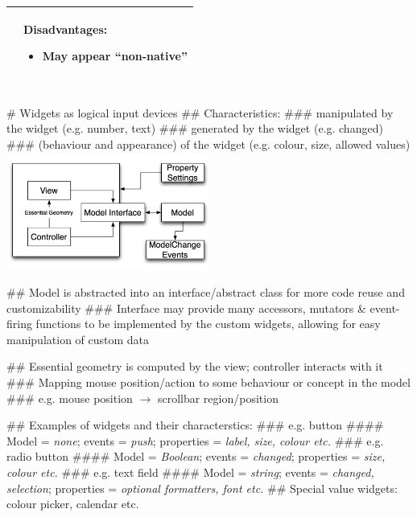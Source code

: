 \documentclass[11pt, oneside]{article}
\newcommand*{\un}[1]{\underline{\smash{#1}}}        %
\newenvironment{itemized}{\begin{itemize}[noitemsep, topsep=0pt, leftmargin=*]}{\end{itemize}}  %
\begin{document}
\begin{tabular}{|l|l|}
\begin{minipage}[t]{0.45\textwidth}
\begin{itemized}
    \end{itemized}
    \vspace*{0.5em}
\end{minipage}
&
\begin{minipage}[t]{0.45\textwidth}
Disadvantages:
    \begin{itemized}
        \item May appear ``non-native''
    \end{itemized}
    \vspace*{0.5em}
\end{minipage}  \\
\hline
\end{tabular} \\

# Widgets as logical input devices
## Characteristics:
### \un{Model} manipulated by the widget (e.g. number, text)
### \un{Events} generated by the widget (e.g. changed)
### \un{Properties} (behaviour and appearance) of the widget (e.g. colour, size, allowed values) \\
\includegraphics[width=0.5\textwidth]{res/mvc_widget.png}

## Model is abstracted into an interface/abstract class for more code reuse and customizability
### Interface may provide many accessors, mutators \& event-firing functions to be implemented by the custom widgets, allowing for easy manipulation of custom data

## Essential geometry is computed by the view; controller interacts with it
### Mapping mouse position/action to some behaviour or concept in the model
### e.g. mouse position $\rightarrow$ scrollbar region/position

## Examples of widgets and their characterstics:
### e.g. button
#### Model = \emph{none}; events = \emph{push}; properties = \emph{label, size, colour etc.}
### e.g. radio button
#### Model = \emph{Boolean}; events = \emph{changed}; properties = \emph{size, colour etc.}
### e.g. text field
#### Model = \emph{string}; events = \emph{changed, selection}; properties = \emph{optional formatters, font etc.}
## Special value widgets: colour picker, calendar etc.
\end{document}
